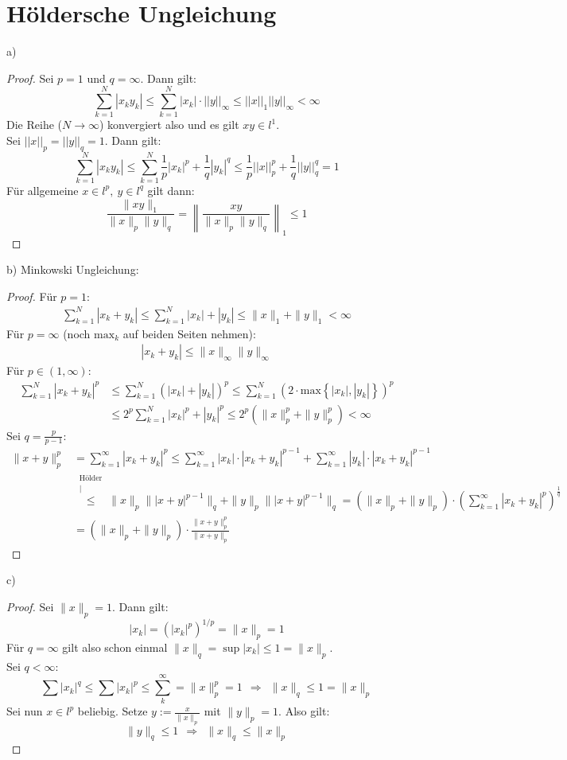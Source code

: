 \documentclass[a4paper,12pt]{article}
\newcommand{\kom}{}
\newcommand{\kla}{}
\newcommand{\klammer}{}
\begin{document}
\section{Höldersche Ungleichung}
a)
\begin{proof}
Sei $p=1$ und $q=\infty$. Dann gilt:
$$\sum_{k=1}^N|x_ky_k|\le\sum_{k=1}^N|x_k|\cdot ||y||_\infty \le ||x||_1||y||_\infty <\infty$$
Die Reihe ($N\rightarrow\infty$) konvergiert also und es gilt $xy\in l^1$.\\
Sei $||x||_p=||y||_q=1$. Dann gilt:
$$\sum_{k=1}^N|x_ky_k|\le\sum_{k=1}^N\frac{1}{p}|x_k|^p+\frac{1}{q}|y_k|^q\le\frac{1}{p}||x||_p^p+\frac{1}{q}||y||_q^q=1$$
Für allgemeine $x\in l^p,\ y\in l^q$ gilt dann:
$$\frac{\|xy\|_1}{\|x\|_p\|y\|_q}=\left\|\frac{xy}{\|x\|_p\|y\|_q}\right\|_1\le 1$$
\end{proof}
b) Minkowski Ungleichung:
\begin{proof}
Für $p=1$:
\begin{align*}
\sum_{k=1}^N|x_k+y_k|\le\sum_{k=1}^N|x_k|+|y_k|\le\|x\|_1+\|y\|_1<\infty
\end{align*}
Für $p=\infty$ (noch $\mathrm{max}_k$ auf beiden Seiten nehmen):
\begin{align*}
|x_k+y_k|\le \|x\|_\infty\|y\|_\infty
\end{align*}
Für $p\in(1,\infty)$:
\begin{align*}
\sum_{k=1}^N|x_k+y_k|^p&\le\sum_{k=1}^N\kla\left( {|x_k|+|y_k|} \right)^p\le\sum_{k=1}^N\kla\left( {2\cdot\mathrm{max}\klammer\left\{ {|x_k|,|y_k|} \right\} } \right)^p\\
&\le 2^p\sum_{k=1}^N|x_k|^p+|y_k|^p\le 2^p\kla\left( {\|x\|_p^p+\|y\|_p^p} \right)<\infty
\end{align*}
Sei $q=\frac{p}{p-1}$:
\begin{align*}
\|x+y\|_p^p&=\sum_{k=1}^\infty|x_k+y_k|^p\le\sum_{k=1}^\infty|x_k|\cdot |x_k+y_k|^{p-1}+\sum_{k=1}^\infty|y_k|\cdot |x_k+y_k|^{p-1}\\
&\kom\overset{\substack{{\text{Hölder}} \\ |}}{\le}\|x\|_p\||x+y|^{p-1}\|_q+\|y\|_p\||x+y|^{p-1}\|_q=\kla\left( {\|x\|_p+\|y\|_p} \right)\cdot\kla\left( {\sum_{k=1}^\infty|x_k+y_k|^p} \right)^\frac{1}{q}\\
&=\kla\left( {\|x\|_p+\|y\|_p} \right)\cdot \frac{\|x+y\|_p^p}{\|x+y\|_p}
\end{align*}
\end{proof}
c) 
\begin{proof}
Sei $\|x\|_p=1$. Dann gilt:
$$|x_k|=\kla\left( {|x_k|^p} \right)^{1/p}=\|x\|_p=1$$
Für $q=\infty$ gilt also schon einmal $\|x\|_q=\sup |x_k|\le 1=\|x\|_p$.\\
Sei $q<\infty$:
$$\sum |x_k|^q\le\sum|x_k|^p\le\sum_k^\infty=\|x\|_p^p=1\ \ \Rightarrow\ \ \|x\|_q\le 1=\|x\|_p$$
Sei nun $x\in l^p$ beliebig. Setze $y:=\frac{x}{\|x\|_p}$ mit $\|y\|_p=1$. Also gilt:
$$\|y\|_q\le 1\ \ \Rightarrow\ \ \|x\|_q\le\|x\|_p$$
\end{proof}
\end{document}
